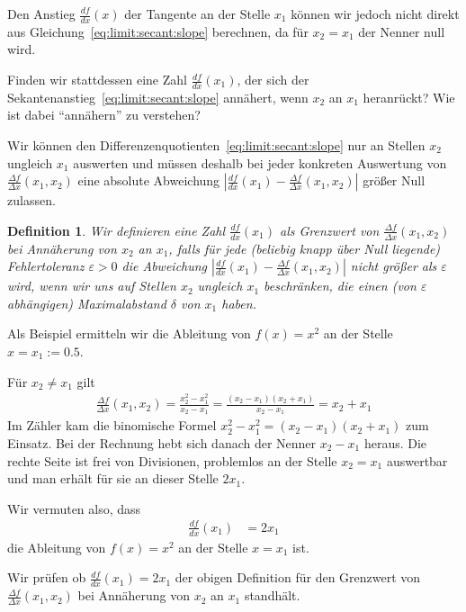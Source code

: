 \documentclass{article}
\let\eps\varepsilon
\def\ddx#1{\frac{d#1}{dx}}
\def\DDx#1{\frac{\Delta#1}{\Delta x}}
\newtheorem{Def}{Definition}
\begin{document}
Den Anstieg $\ddx f(x)$ der Tangente an der Stelle $x_1$ können wir jedoch nicht direkt aus Gleichung~\eqref{eq:limit:secant:slope} berechnen, da für $x_2=x_1$ der Nenner null wird.

Finden wir stattdessen eine Zahl $\ddx f(x_1)$, der sich der Sekantenanstieg~\eqref{eq:limit:secant:slope} annähert, wenn $x_2$ an $x_1$ heranrückt?
Wie ist dabei "`annähern"' zu verstehen?

Wir können den Differenzenquotienten~\eqref{eq:limit:secant:slope} nur
an Stellen $x_2$ ungleich $x_1$ auswerten und müssen deshalb bei jeder
konkreten Auswertung von $\frac{\Delta f}{\Delta x}(x_1,x_2)$ eine
absolute Abweichung
$|\ddx f(x_1) - \frac{\Delta f}{\Delta x}(x_1,x_2)|$ größer Null
zulassen.

\begin{Def}
  Wir definieren eine Zahl $\ddx f(x_1)$ als \emph{Grenzwert} von
  $\DDx f(x_1,x_2)$ bei Annäherung von $x_2$ an $x_1$, falls für jede
  (beliebig knapp über Null liegende) Fehlertoleranz $\eps>0$ die
  Abweichung $|\ddx f(x_1) - \frac{\Delta f}{\Delta x}(x_1,x_2)|$
  nicht größer als $\eps$ wird, wenn wir uns auf Stellen $x_2$
  ungleich $x_1$ beschränken, die einen (von $\eps$ abhängigen)
  Maximalabstand $\delta$ von $x_1$ haben.
\end{Def}

Als Beispiel ermitteln wir die Ableitung von $f(x)=x^2$ an der Stelle $x=x_1:=0.5$.

Für $x_2\neq x_1$ gilt
\begin{align}
  \DDx f(x_1,x_2) = \frac{x_2^2 - x_1^2}{x_2-x_1} = \frac{(x_2-x_1)(x_2+x_1)}{x_2-x_1}= x_2 + x_1
  \label{eq:limit:DDxf}
\end{align}
Im Zähler kam die binomische Formel $x_2^2-x_1^2=(x_2-x_1)(x_2+x_1)$ zum Einsatz.
Bei der Rechnung hebt sich danach der Nenner $x_2-x_1$ heraus. Die rechte
Seite ist frei von Divisionen, problemlos an der Stelle $x_2=x_1$
auswertbar und man erhält für sie an dieser Stelle $2 x_1$.

Wir vermuten also, dass
\begin{align}
  \ddx f(x_1) &= 2x_1
                \label{eq:limit:ddxf}
\end{align}
die Ableitung von $f(x)=x^2$ an der Stelle $x=x_1$ ist.

Wir prüfen ob $\ddx f(x_1)=2x_1$ der obigen Definition für den
Grenzwert von $\DDx f(x_1,x_2)$ bei Annäherung von $x_2$ an $x_1$ standhält.
\end{document}
